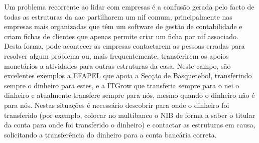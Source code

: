 Um problema recorrente ao lidar com empresas é a confusão gerada pelo facto de todas as estruturas da \acrshort{aac} partilharem um \acrshort{nif} comum, principalmente nas empresas mais organizadas que têm um software de gestão de contabilidade e criam fichas de clientes que apenas permite criar um ficha por \acrshort{nif} associado. Desta forma, pode acontecer as empresas contactarem as pessoas erradas para resolver algum problema ou, mais frequentemente, transferirem os apoios monetários a atividades para outras estruturas da casa. Neste campo, são excelentes exemplos a EFAPEL que apoia a Secção de Basquetebol, transferindo sempre o dinheiro para estes, e a ITGrow que transferia sempre para o \acrshort{nei} o dinheiro e atualmente transfere sempre para nós, mesmo quando o dinheiro não é para nós. Nestas situações é necessário descobrir para onde o dinheiro foi transferido (por exemplo, colocar no multibanco o NIB de forma a saber o titular da conta para onde foi transferido o dinheiro) e contactar as estruturas em causa, solicitando a transferência do dinheiro para a conta bancária correta.